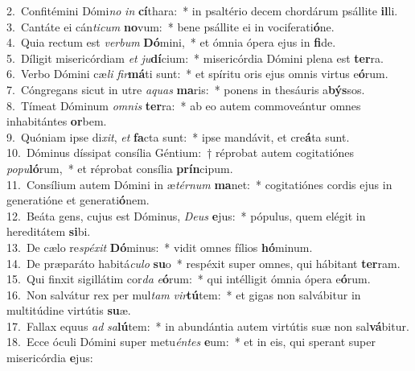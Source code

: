 {2.~}Confitémini Dómi\textit{no} \textit{in} \textbf{cí}thara:~* in psaltério decem chordárum psállite \textbf{il}li.\\
{3.~}Cantáte ei cán\textit{ti}\textit{cum} \textbf{no}vum:~* bene psállite ei in vociferati\textbf{ó}ne.\\
{4.~}Quia rectum est \textit{ver}\textit{bum} \textbf{Dó}mini,~* et ómnia ópera ejus in \textbf{fi}de.\\
{5.~}Díligit misericórdiam \textit{et} \textit{ju}\textbf{dí}cium:~* misericórdia Dómini plena est \textbf{ter}ra.\\
{6.~}Verbo Dómini cæ\textit{li} \textit{fir}\textbf{má}ti sunt:~* et spíritu oris ejus omnis virtus e\textbf{ó}rum.\\
{7.~}Cóngregans sicut in utre \textit{a}\textit{quas} \textbf{ma}ris:~* ponens in thesáuris a\textbf{býs}sos.\\
{8.~}Tímeat Dóminum \textit{om}\textit{nis} \textbf{ter}ra:~* ab eo autem commoveántur omnes inhabitántes \textbf{or}bem.\\
{9.~}Quóniam ipse di\textit{xit}, \textit{et} \textbf{fa}cta sunt:~* ipse mandávit, et cre\textbf{á}ta sunt.\\
{10.~}Dóminus díssipat consília Géntium:~† réprobat autem cogitatiónes \textit{po}\textit{pu}\textbf{ló}rum,~* et réprobat consília \textbf{prín}cipum.\\
{11.~}Consílium autem Dómini in æ\textit{tér}\textit{num} \textbf{ma}net:~* cogitatiónes cordis ejus in generatióne et generati\textbf{ó}nem.\\
{12.~}Beáta gens, cujus est Dóminus, \textit{De}\textit{us} \textbf{e}jus:~* pópulus, quem elégit in hereditátem \textbf{si}bi.\\
{13.~}De cælo re\textit{spé}\textit{xit} \textbf{Dó}minus:~* vidit omnes fílios \textbf{hó}minum.\\
{14.~}De præparáto habitá\textit{cu}\textit{lo} \textbf{su}o~* respéxit super omnes, qui hábitant \textbf{ter}ram.\\
{15.~}Qui finxit sigillátim cor\textit{da} \textit{e}\textbf{ó}rum:~* qui intélligit ómnia ópera e\textbf{ó}rum.\\
{16.~}Non salvátur rex per mul\textit{tam} \textit{vir}\textbf{tú}tem:~* et gigas non salvábitur in multitúdine virtútis \textbf{su}æ.\\
{17.~}Fallax equus \textit{ad} \textit{sa}\textbf{lú}tem:~* in abundántia autem virtútis suæ non sal\textbf{vá}bitur.\\
{18.~}Ecce óculi Dómini super metu\textit{én}\textit{tes} \textbf{e}um:~* et in eis, qui sperant super misericórdia \textbf{e}jus:\\
